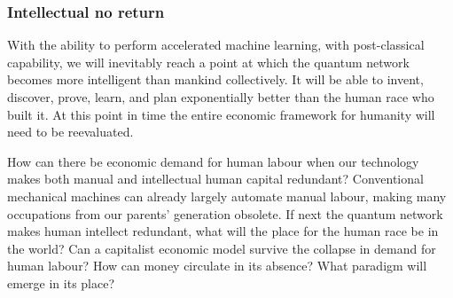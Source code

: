 %
%

\subsubsection{Intellectual no return}

With the ability to perform accelerated machine learning, with post-classical capability, we will inevitably reach a point at which the quantum network becomes more intelligent than mankind collectively. It will be able to invent, discover, prove, learn, and plan exponentially better than the human race who built it. At this point in time the entire economic framework for humanity will need to be reevaluated.

How can there be economic demand for human labour when our technology makes both manual and intellectual human capital redundant? Conventional mechanical machines can already largely automate manual labour, making many occupations from our parents' generation obsolete. If next the quantum network makes human intellect redundant, what will the place for the human race be in the world? Can a capitalist economic model survive the collapse in demand for human labour? How can money circulate in its absence? What paradigm will emerge in its place?

